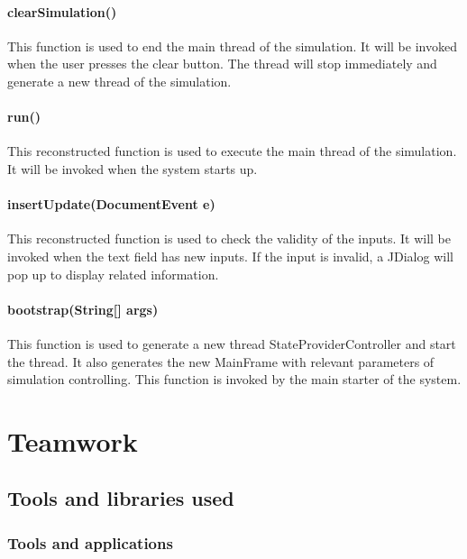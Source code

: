 \documentclass[a4paper,12pt]{article}
\begin{document}
\paragraph{clearSimulation()} This function is used to end the main thread of the simulation. It will be invoked when the user presses the clear button. The thread will stop immediately and generate a new thread of the simulation.
\paragraph{run()}This reconstructed function is used to execute the main thread of the simulation. It will be invoked when the system starts up.

\paragraph{insertUpdate(DocumentEvent e)} This reconstructed function is used to check the validity of the inputs. It will be invoked when the text field has new inputs.  If the input is invalid, a JDialog will pop up to display related information.

\paragraph{bootstrap(String[] args)} This function is used to generate a new thread StateProviderController and start the thread. It also generates the new MainFrame with relevant parameters of simulation controlling. This function is invoked by the main starter of the system.

\section{Teamwork}

\subsection{Tools and libraries used}

\subsubsection*{Tools and applications}
\end{document}
